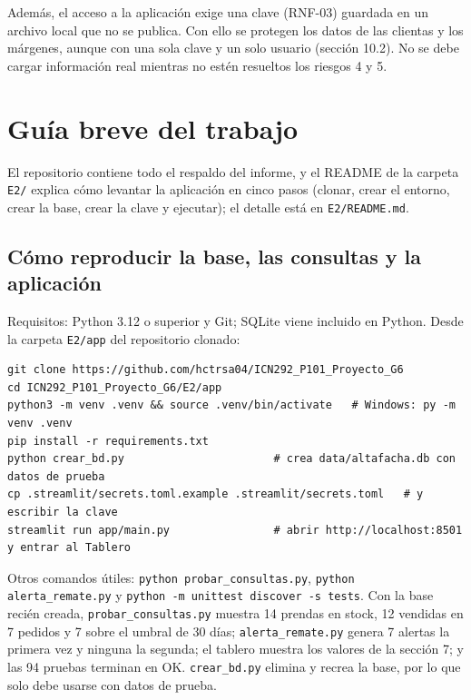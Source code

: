 \documentclass[11pt,letterpaper]{article}
\begin{document}
Además, el acceso a la aplicación exige una clave (RNF-03) guardada en un archivo local que no se publica. Con ello se protegen los datos de las clientas y los márgenes, aunque con una sola clave y un solo usuario (sección 10.2). No se debe cargar información real mientras no estén resueltos los riesgos 4 y 5.

\newpage
\section{Guía breve del trabajo}

El repositorio contiene todo el respaldo del informe, y el README de la carpeta \texttt{E2/} explica cómo levantar la aplicación en cinco pasos (clonar, crear el entorno, crear la base, crear la clave y ejecutar); el detalle está en \texttt{E2/\allowbreak{}README.md}.

\subsection{Cómo reproducir la base, las consultas y la aplicación}

Requisitos: Python 3.12 o superior y Git; SQLite viene incluido en Python. Desde la carpeta \texttt{E2/app} del repositorio clonado:
\begin{lstlisting}
git clone https://github.com/hctrsa04/ICN292_P101_Proyecto_G6
cd ICN292_P101_Proyecto_G6/E2/app
python3 -m venv .venv && source .venv/bin/activate   # Windows: py -m venv .venv
pip install -r requirements.txt
python crear_bd.py                       # crea data/altafacha.db con datos de prueba
cp .streamlit/secrets.toml.example .streamlit/secrets.toml   # y escribir la clave
streamlit run app/main.py                # abrir http://localhost:8501 y entrar al Tablero
\end{lstlisting}

Otros comandos útiles: \texttt{python probar\_\allowbreak{}consultas.py}, \texttt{python alerta\_\allowbreak{}remate.py} y \texttt{python -m unittest discover -s tests}.
Con la base recién creada, \texttt{probar\_\allowbreak{}consultas.py} muestra 14 prendas en stock, 12 vendidas en 7 pedidos y 7 sobre el umbral de 30 días; \texttt{alerta\_\allowbreak{}remate.py} genera 7 alertas la primera vez y ninguna la segunda; el tablero muestra los valores de la sección 7; y las 94 pruebas terminan en OK. \texttt{crear\_\allowbreak{}bd.py} elimina y recrea la base, por lo que solo debe usarse con datos de prueba.
\end{document}
